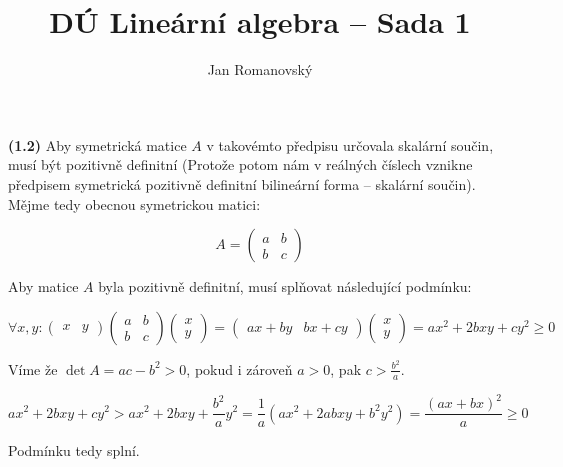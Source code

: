 \documentclass{article}
\title{DÚ Lineární algebra -- Sada 1}
\author{Jan Romanovský}
\begin{document}
\maketitle

\textbf{(1.2)} Aby symetrická matice $A$ v takovémto předpisu určovala skalární součin, musí být pozitivně definitní (Protože potom nám v reálných číslech vznikne předpisem symetrická pozitivně definitní bilineární forma -- skalární součin). Mějme tedy obecnou symetrickou matici:

$$A = \begin{pmatrix}
  a & b \\ b & c
\end{pmatrix}$$

Aby matice $A$ byla pozitivně definitní, musí splňovat následující podmínku:

$$\forall x, y: \begin{pmatrix}
  x & y
\end{pmatrix}\begin{pmatrix}
  a & b \\ b & c
\end{pmatrix}\begin{pmatrix}
  x \\ y
\end{pmatrix}=\begin{pmatrix}
  ax + by & bx + cy
\end{pmatrix}\begin{pmatrix}
  x \\ y
\end{pmatrix}= ax^2+2bxy + cy^2 \geq 0$$

Víme že $\det A = ac - b^2 > 0$, pokud i zároveň $a > 0$, pak $c > \frac{b^2}{a}$.

$$ax^2+2bxy + cy^2 > ax^2+2bxy+\frac{b^2}{a}y^2 = \frac{1}{a}(ax^2+2abxy+b^2y^2) = \frac{(ax+bx)^2}{a} \geq 0$$

Podmínku tedy splní.
\end{document}

